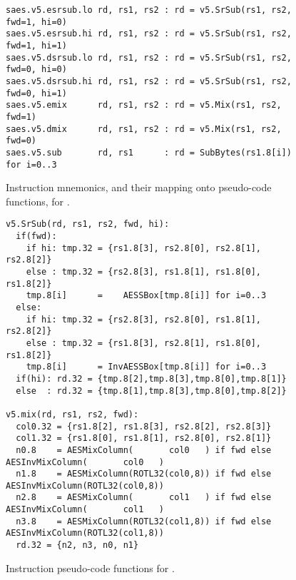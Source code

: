 
\vspace*{\fill}

\begin{figure}[!h]
\begin{lstlisting}[language=pseudo,style=block]
saes.v5.esrsub.lo rd, rs1, rs2 : rd = v5.SrSub(rs1, rs2, fwd=1, hi=0)
saes.v5.esrsub.hi rd, rs1, rs2 : rd = v5.SrSub(rs1, rs2, fwd=1, hi=1)
saes.v5.dsrsub.lo rd, rs1, rs2 : rd = v5.SrSub(rs1, rs2, fwd=0, hi=0)
saes.v5.dsrsub.hi rd, rs1, rs2 : rd = v5.SrSub(rs1, rs2, fwd=0, hi=1)
saes.v5.emix      rd, rs1, rs2 : rd = v5.Mix(rs1, rs2, fwd=1)
saes.v5.dmix      rd, rs1, rs2 : rd = v5.Mix(rs1, rs2, fwd=0)
saes.v5.sub       rd, rs1      : rd = SubBytes(rs1.8[i])         for i=0..3
\end{lstlisting}
\caption{
  Instruction mnemonics, and their mapping onto pseudo-code functions, for .
}
\label{fig:v5:mnemonics}
\end{figure}

\begin{figure}[!h]
\begin{lstlisting}[language=pseudo,style=block]
v5.SrSub(rd, rs1, rs2, fwd, hi):
  if(fwd):
    if hi: tmp.32 = {rs1.8[3], rs2.8[0], rs2.8[1], rs2.8[2]}
    else : tmp.32 = {rs2.8[3], rs1.8[1], rs1.8[0], rs1.8[2]}
    tmp.8[i]      =    AESSBox[tmp.8[i]] for i=0..3
  else:
    if hi: tmp.32 = {rs2.8[3], rs2.8[0], rs1.8[1], rs2.8[2]}
    else : tmp.32 = {rs1.8[3], rs2.8[1], rs1.8[0], rs1.8[2]}
    tmp.8[i]      = InvAESSBox[tmp.8[i]] for i=0..3
  if(hi): rd.32 = {tmp.8[2],tmp.8[3],tmp.8[0],tmp.8[1]}
  else  : rd.32 = {tmp.8[1],tmp.8[3],tmp.8[0],tmp.8[2]}

v5.mix(rd, rs1, rs2, fwd):
  col0.32 = {rs1.8[2], rs1.8[3], rs2.8[2], rs2.8[3]}
  col1.32 = {rs1.8[0], rs1.8[1], rs2.8[0], rs2.8[1]}
  n0.8    = AESMixColumn(       col0   ) if fwd else AESInvMixColumn(       col0   )
  n1.8    = AESMixColumn(ROTL32(col0,8)) if fwd else AESInvMixColumn(ROTL32(col0,8))
  n2.8    = AESMixColumn(       col1   ) if fwd else AESInvMixColumn(       col1   )
  n3.8    = AESMixColumn(ROTL32(col1,8)) if fwd else AESInvMixColumn(ROTL32(col1,8))
  rd.32 = {n2, n3, n0, n1}
\end{lstlisting}
\caption{
  Instruction pseudo-code functions for .
}
\label{fig:v5:pseudo}
\end{figure}

